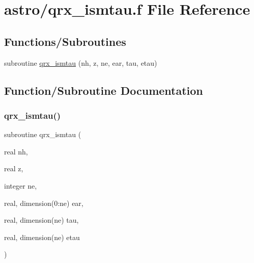 \hypertarget{qrx__ismtau_8f}{}\section{astro/qrx\+\_\+ismtau.f File Reference}
\label{qrx__ismtau_8f}
\subsection*{Functions/\+Subroutines}
\begin{DoxyCompactItemize}
\item 
subroutine \hyperlink{qrx__ismtau_8f_abba926fce13b00c6dd320909d6642984}{qrx\+\_\+ismtau} (nh, z, ne, ear, tau, etau)
\end{DoxyCompactItemize}


\subsection{Function/\+Subroutine Documentation}
\mbox{\label{qrx__ismtau_8f_abba926fce13b00c6dd320909d6642984}} 
\subsubsection{\texorpdfstring{qrx\+\_\+ismtau()}{qrx\_ismtau()}}
{\footnotesize\ttfamily subroutine qrx\+\_\+ismtau (\begin{DoxyParamCaption}\item[{real}]{nh,  }\item[{real}]{z,  }\item[{integer}]{ne,  }\item[{real, dimension(0\+:ne)}]{ear,  }\item[{real, dimension(ne)}]{tau,  }\item[{real, dimension(ne)}]{etau }\end{DoxyParamCaption})}

